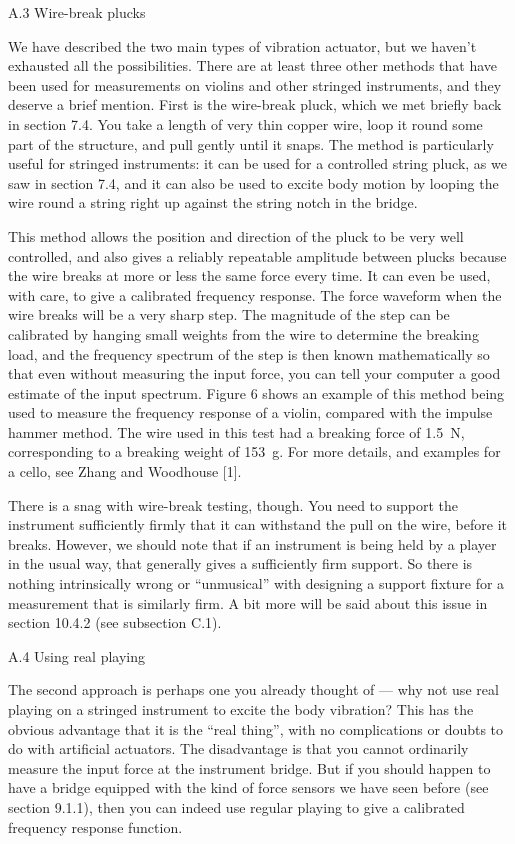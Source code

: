   A.3 Wire-break plucks 

  We have described the two main types of vibration actuator, but we haven’t 
  exhausted all the possibilities. There are at least three other methods that 
  have been used for measurements on violins and other stringed instruments, 
  and they deserve a brief mention. First is the wire-break pluck, which we met 
  briefly back in section 7.4. You take a length of very thin copper wire, loop 
  it round some part of the structure, and pull gently until it snaps. The 
  method is particularly useful for stringed instruments: it can be used for a 
  controlled string pluck, as we saw in section 7.4, and it can also be used to 
  excite body motion by looping the wire round a string right up against the 
  string notch in the bridge. 

  This method allows the position and direction of the pluck to be very well 
  controlled, and also gives a reliably repeatable amplitude between plucks 
  because the wire breaks at more or less the same force every time. It can 
  even be used, with care, to give a calibrated frequency response. The force 
  waveform when the wire breaks will be a very sharp step. The magnitude of the 
  step can be calibrated by hanging small weights from the wire to determine 
  the breaking load, and the frequency spectrum of the step is then known 
  mathematically so that even without measuring the input force, you can tell 
  your computer a good estimate of the input spectrum. Figure 6 shows an 
  example of this method being used to measure the frequency response of a 
  violin, compared with the impulse hammer method. The wire used in this test 
  had a breaking force of 1.5~N, corresponding to a breaking weight of 153~g. 
  For more details, and examples for a cello, see Zhang and Woodhouse [1]. 

  There is a snag with wire-break testing, though. You need to support the 
  instrument sufficiently firmly that it can withstand the pull on the wire, 
  before it breaks. However, we should note that if an instrument is being held 
  by a player in the usual way, that generally gives a sufficiently firm 
  support. So there is nothing intrinsically wrong or ``unmusical'' with 
  designing a support fixture for a measurement that is similarly firm. A bit 
  more will be said about this issue in section 10.4.2 (see subsection C.1). 

  A.4 Using real playing 

  The second approach is perhaps one you already thought of — why not use real 
  playing on a stringed instrument to excite the body vibration? This has the 
  obvious advantage that it is the “real thing”, with no complications or 
  doubts to do with artificial actuators. The disadvantage is that you cannot 
  ordinarily measure the input force at the instrument bridge. But if you 
  should happen to have a bridge equipped with the kind of force sensors we 
  have seen before (see section 9.1.1), then you can indeed use regular playing 
  to give a calibrated frequency response function. 

